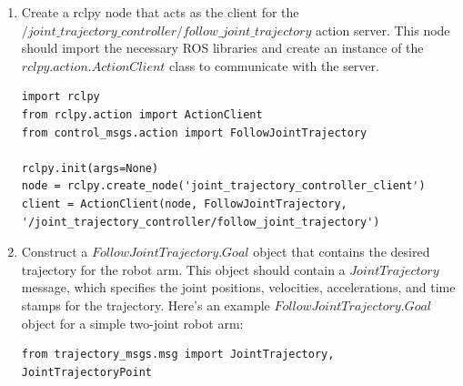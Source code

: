 \documentclass[12pt,oneside]{article}
\begin{document}
\begin{enumerate}
\item Create a rclpy node that acts as the client for the\\ $/joint\_trajectory\_controller/follow\_joint\_trajectory$ action server. This node should import the necessary ROS libraries and create an instance of the $rclpy.action.ActionClient$ class to communicate with the server.
\begin{tcolorbox}[]\label{box:mybox-2}
\begin{verbatim}
import rclpy
from rclpy.action import ActionClient
from control_msgs.action import FollowJointTrajectory

rclpy.init(args=None)
node = rclpy.create_node('joint_trajectory_controller_client')
client = ActionClient(node, FollowJointTrajectory, '/joint_trajectory_controller/follow_joint_trajectory')
\end{verbatim}
\end{tcolorbox}
\item Construct a $FollowJointTrajectory.Goal$ object that contains the desired trajectory for the robot arm. This object should contain a $JointTrajectory$ message, which specifies the joint positions, velocities, accelerations, and time stamps for the trajectory. Here's an example $FollowJointTrajectory.Goal$ object for a simple two-joint robot arm:
\begin{tcolorbox}[]\label{box:mybox-3}
\begin{verbatim}
from trajectory_msgs.msg import JointTrajectory, JointTrajectoryPoint


\end{verbatim}
\end{tcolorbox}
\end{enumerate}
\end{document}
